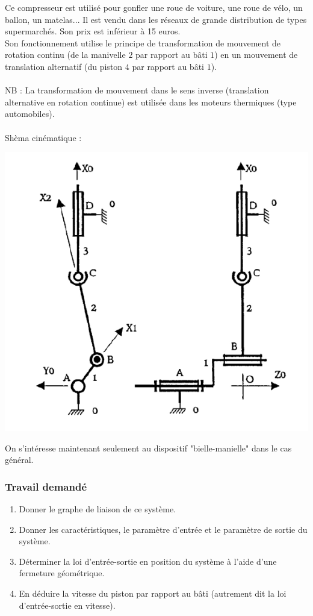 Ce compresseur est utilis\'e pour gonfler une roue de voiture, une roue de v\'elo, un ballon, un matelas... Il est vendu dans les r\'eseaux de grande distribution de types supermarch\'es. Son prix est inf\'erieur \`a 15 euros.\\
Son fonctionnement utilise le principe de transformation de mouvement de rotation continu (de la manivelle $2$ par rapport au b\^ati $1$) en un mouvement de translation alternatif (du piston $4$ par rapport au b\^ati $1$).\\
\\
NB : La transformation de mouvement dans le sens inverse (translation alternative en rotation continue) est utilis\'ee dans les moteurs thermiques (type automobiles).\\
\\
Sh\`ema cin\'ematique :
\begin{center}
    \includegraphics[scale=0.4]{png/2_exo0.png}
\end{center}

On s'int\'eresse maintenant seulement au dispositif "bielle-manielle" dans le cas g\'en\'eral.\\

\subsubsection{Travail demandé}
\begin{enumerate}
\item Donner le graphe de liaison de ce syst\`eme.
\item Donner les caract\'eristiques, le param\`etre d'entr\'ee et le param\`etre de sortie du syst\`eme.
\item D\'eterminer la loi d'entr\'ee-sortie en position du syst\`eme \`a l'aide d'une fermeture g\'eom\'etrique.
\item En d\'eduire la vitesse du piston par rapport au b\^ati (autrement dit la loi d'entr\'ee-sortie en vitesse).
\end{enumerate}

